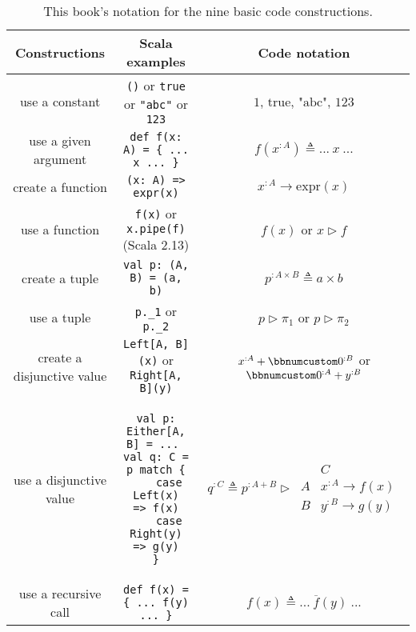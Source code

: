 \begin{table}
\begin{centering}
\begin{tabular}{|c|c|c|}
\hline 
\textbf{\small{}Constructions} & \textbf{\small{}Scala examples} & \textbf{\small{}Code notation}\tabularnewline
\hline 
\hline 
{\small{}use a constant} & {\small{}}\lstinline!()!{\small{} or }\lstinline!true!{\small{}
or }\lstinline!"abc"!{\small{} or }\lstinline!123! & {\small{}$1$, $\text{true}$, $\text{"abc"}$, $123$}\tabularnewline
\hline 
{\small{}use a given argument} & {\small{}}\lstinline!def f(x: A) = { ... x ... }! & {\small{}$f(x^{:A})\triangleq...~x~...$}\tabularnewline
\hline 
{\small{}create a function} & {\small{}}\lstinline!(x: A) => expr(x)! & {\small{}$x^{:A}\rightarrow\text{expr}\left(x\right)$}\tabularnewline
\hline 
{\small{}use a function} & {\small{}}\lstinline!f(x)!{\small{} or }\lstinline!x.pipe(f)!{\small{}
(Scala 2.13)} & {\small{}$f(x)$ or $x\triangleright f$}\tabularnewline
\hline 
{\small{}create a tuple} & {\small{}}\lstinline!val p: (A, B) = (a, b)! & {\small{}$p^{:A\times B}\triangleq a\times b$}\tabularnewline
\hline 
{\small{}use a tuple} & {\small{}}\lstinline!p._1!{\small{} or }\lstinline!p._2! & {\small{}$p\triangleright\pi_{1}$ or $p\triangleright\pi_{2}$}\tabularnewline
\hline 
{\small{}create a disjunctive value} & {\small{}}\lstinline!Left[A, B](x)!{\small{} or }\lstinline!Right[A, B](y)! & {\small{}$x^{:A}+\bbnum 0^{:B}$ or $\bbnum 0^{:A}+y^{:B}$}\tabularnewline
\hline 
{\small{}use a disjunctive value} & {\small{}\hspace*{-0.013\linewidth}}%
\begin{minipage}[c][1\totalheight][b]{0.33\columnwidth}%
{\small{}\vspace{0.14\baselineskip}
}
\begin{lstlisting}
val p: Either[A, B] = ... 
val q: C = p match {
    case Left(x)   => f(x)
    case Right(y)  => g(y)
}
\end{lstlisting}
{\small{}\vspace{-0.1\baselineskip}
}%
\end{minipage}{\small{} \hspace*{-0.009\linewidth}} & {\small{}$q^{:C}\triangleq p^{:A+B}\triangleright\,\begin{array}{|c||c|}
 & C\\
\hline A & x^{:A}\rightarrow f(x)\\
B & y^{:B}\rightarrow g(y)
\end{array}$}\tabularnewline
\hline 
{\small{}use a recursive call} & {\small{}}\lstinline!def f(x) = { ... f(y) ... }! & {\small{}$f(x)\triangleq...~\overline{f}(y)~...$}\tabularnewline
\hline 
\end{tabular}
\par\end{centering}
\caption{This book\textsf{'}s notation for the nine basic code constructions.\label{tab:Mathematical-notation-for-basic-code-constructions}}
\end{table}



